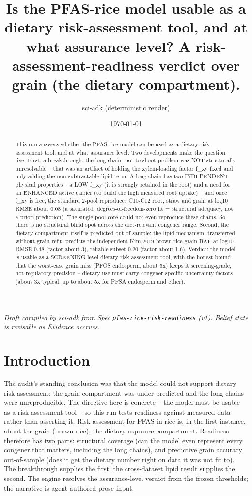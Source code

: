 \documentclass{article}
\title{Is the PFAS-rice model usable as a dietary risk-assessment tool, and at what assurance level? A risk-assessment-readiness verdict over grain (the dietary compartment).}
\author{sci-adk (deterministic render)}
\date{\today}
\begin{document}
\maketitle

\noindent\textit{Draft compiled by sci-adk from Spec \texttt{pfas-rice-risk-readiness} (v1). Belief state is revisable as Evidence accrues.}

\begin{abstract}
This run answers whether the PFAS-rice model can be used as a dietary risk-assessment tool, and at what assurance level. Two developments make the question live. First, a breakthrough: the long-chain root-to-shoot problem was NOT structurally unresolvable -- that was an artifact of holding the xylem-loading factor f\_xy fixed and only adding the non-subtractable lipid term. A long chain has two INDEPENDENT physical properties -- a LOW f\_xy (it is strongly retained in the root) and a need for an ENHANCED active carrier (to build the high measured root uptake) -- and once f\_xy is free, the standard 2-pool reproduces C10-C12 root, straw and grain at log10 RMSE about 0.08 (a saturated, degrees-of-freedom-zero fit = structural adequacy, not a-priori prediction). The single-pool core could not even reproduce these chains. So there is no structural blind spot across the diet-relevant congener range. Second, the dietary compartment itself is predicted out-of-sample: the lipid mechanism, transferred without grain refit, predicts the independent Kim 2019 brown-rice grain BAF at log10 RMSE 0.48 (factor about 3), reliable subset 0.20 (factor about 1.6). Verdict: the model is usable as a SCREENING-level dietary risk-assessment tool, with the honest bound that the worst-case grain miss (PFOS endosperm, about 5x) keeps it screening-grade, not regulatory-precision -- dietary use must carry congener-specific uncertainty factors (about 3x typical, up to about 5x for PFSA endosperm and ether).
\end{abstract}

\section{Introduction}
The audit's standing conclusion was that the model could not support dietary risk assessment: the grain compartment was under-predicted and the long chains were unreproducible. The directive here is concrete -- the model must be usable as a risk-assessment tool -- so this run tests readiness against measured data rather than asserting it. Risk assessment for PFAS in rice is, in the first instance, about the grain (brown rice), the dietary-exposure compartment. Readiness therefore has two parts: structural coverage (can the model even represent every congener that matters, including the long chains), and predictive grain accuracy out-of-sample (does it get the dietary number right on data it was not fit to). The breakthrough supplies the first; the cross-dataset lipid result supplies the second. The engine resolves the assurance-level verdict from the frozen thresholds; the narrative is agent-authored prose input.
\end{document}
